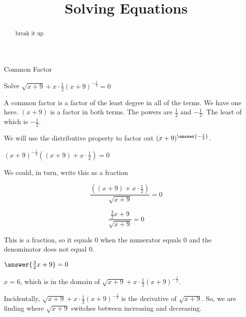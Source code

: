 \documentclass{ximera}
\title{Solving Equations}
\begin{document}
\begin{abstract}
break it up
\end{abstract}
\maketitle





\begin{example}  Common Factor


Solve $\sqrt{x+9} + x \cdot \frac{1}{2} (x+9)^{-\tfrac{1}{2}} = 0$



\begin{explanation}



A common factor is a factor of the least degree in all of the terms.  We have one here. $(x+9)$ is a factor in both terms.  The powers are $\frac{1}{2}$ and $-\frac{1}{2}$. The least of which is $-\frac{1}{2}$.

We will use the distributive property to factor out $(x+9)^{\answer{-\frac{1}{2}}}$.


$(x+9)^{-\tfrac{1}{2}} \left((x+9) + x \cdot \frac{1}{2}\right)  = 0$


We could, in turn, write this as a fraction


\[  \frac{\left((x+9) + x \cdot \frac{1}{2}\right)}{\sqrt{x+9}} = 0 \]


\[  \frac{ \frac{3}{2} x + 9}{\sqrt{x+9}} = 0 \]



This is a fraction, so it equals $0$ when the numerator equals $0$ and the denominator does not equal $0$.


$\answer{\frac{3}{2} x + 9} = 0$



$x = 6$, which is in the domain of $\sqrt{x+9} + x \cdot \frac{1}{2} (x+9)^{-\tfrac{1}{2}}$.


\end{explanation}
\end{example}




Incidentally, $\sqrt{x+9} + x \cdot \frac{1}{2} (x+9)^{-\tfrac{1}{2}}$ is the derivative of $\sqrt{x+9}$.  So, we are finding where $\sqrt{x+9}$ switches between increasing and decreasing.
\end{document}
